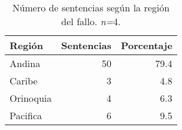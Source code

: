 \begin{table}[!htbp]
\centering
\caption{Número de sentencias según la región del fallo. \textit{n=}4.} 
\label{tab:regfal}
\begin{tabular}{lrr}
  \hline
Región & Sentencias & Porcentaje \\ 
  \hline
Andina & 50 & 79.4 \\ 
  Caribe &  3 & 4.8 \\ 
  Orinoquia &  4 & 6.3 \\ 
  Pacifica &  6 & 9.5 \\ 
   \hline
\end{tabular}
\end{table}
